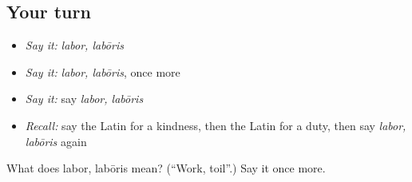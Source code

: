 \subsection*{Your turn}
\begin{itemize}
\raggedright
  \item \emph{Say it:} \emph{labor, labōris}
  \item \emph{Say it:} \emph{labor, labōris}, once more
  \item \emph{Say it:} say \emph{labor, labōris}
  \item \emph{Recall:} say the Latin for a kindness, then the Latin for a duty, then say \emph{labor, labōris} again
\end{itemize}

\begin{tcolorbox}[breakable,colback=teal!4,colframe=teal!35!black,title={Before you move on}]
What does labor, labōris mean? (\textquotedblleft{}Work, toil\textquotedblright{}.) Say it once more.
\end{tcolorbox}

